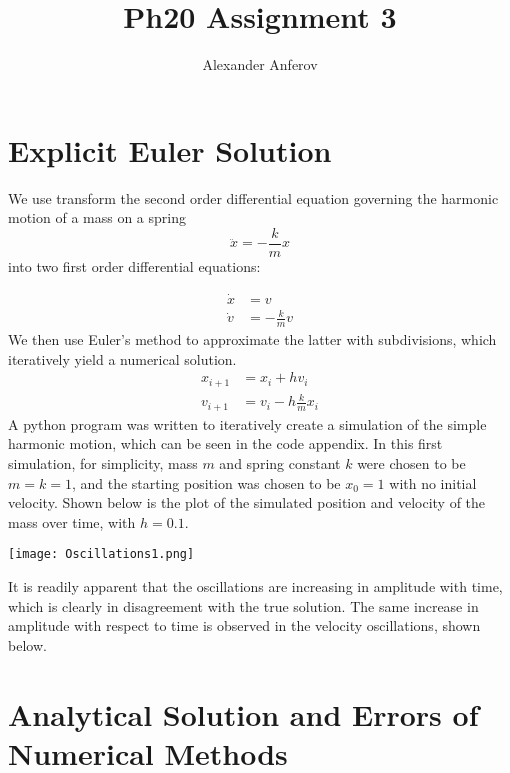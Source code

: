 \documentclass{scrartcl}
\title{Ph20 Assignment 3}
\author{Alexander Anferov}
\begin{document}
\maketitle
\section{Explicit Euler Solution}
We use transform the second order differential equation governing the harmonic motion of a mass on a spring
\[
\ddot{x} = -\frac{k}{m}x
\]
into two first order differential equations:

\begin{align*}
\dot{x} &= v \\ 
\dot{v} &= -\frac{k}{m}v
\end{align*}
We then use Euler's method to approximate the latter with subdivisions, which iteratively yield a numerical solution.
\begin{align*}
x_{i+1} &= x_i + hv_i \\ 
v_{i+1} &= v_i - h\frac{k}{m}x_i
\end{align*}
A python program was written to iteratively create a simulation of the simple harmonic motion, which can be seen in the code appendix. In this first simulation, for simplicity, mass $m$ and spring constant $k$ were chosen to be $m=k=1$, and the starting position was chosen to be $x_0 = 1$ with no initial velocity. Shown below is the plot of the simulated position and velocity of the mass over time, with $h=0.1$.
\begin{center}
\texttt{[image: Oscillations1.png]}
\end{center}
It is readily apparent that the oscillations are increasing in amplitude with time, which is clearly in disagreement with the true solution. The same increase in amplitude with respect to time is observed in the velocity oscillations, shown below.

\section{Analytical Solution and Errors of Numerical Methods}
\end{document}
